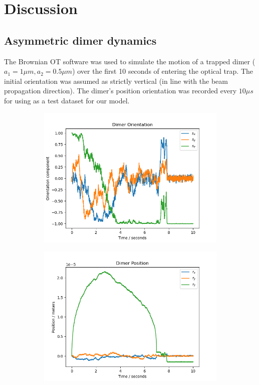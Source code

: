 \documentclass[final, 3p]{elsarticle}
\begin{document}
\section{Discussion}
\label{sec:Discussion}
\subsection{Asymmetric dimer dynamics}
\label{sec:3.1}
The Brownian OT software was used to simulate the motion of a trapped dimer ($a_1=1\mu m, a_2=0.5\mu m$) over the first 10 seconds of entering the optical trap. The initial orientation was assumed as strictly vertical (in line with the beam propagation direction). The dimer's position orientation was recorded every $10 \mu s$ for using as a test dataset for our model. 

\begin{figure}[h]
	\centering
	\begin{subfigure}{0.45\textwidth}
		\includegraphics[width =\textwidth]{./Images/traj.png}
		\subcaption{}
	\end{subfigure}
	\begin{subfigure}{0.45\textwidth}
		\includegraphics[width=\textwidth]{./Images/pos.png}

\end{subfigure}
\end{figure}
\end{document}
